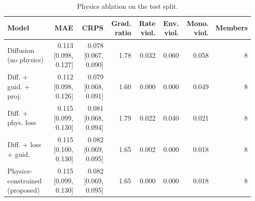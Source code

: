 \begin{table}[t]
\centering
\caption{Physics ablation on the test split.}
\label{tab:ablation}
\scriptsize
\begin{tabular}{lrrrrrrr}
\hline
Model & MAE & CRPS & Grad. ratio & Rate viol. & Env. viol. & Mono. viol. & Members \\
\hline
Diffusion (no physics) & 0.113 [0.098, 0.127] & 0.078 [0.067, 0.090] & 1.78 & 0.032 & 0.060 & 0.058 & 8 \\
Diff. + guid. + proj. & 0.112 [0.098, 0.126] & 0.079 [0.068, 0.091] & 1.60 & 0.000 & 0.000 & 0.049 & 8 \\
Diff. + phys. loss & 0.115 [0.099, 0.130] & 0.081 [0.068, 0.094] & 1.79 & 0.022 & 0.040 & 0.021 & 8 \\
Diff. + loss + guid. & 0.115 [0.100, 0.130] & 0.082 [0.069, 0.095] & 1.65 & 0.002 & 0.000 & 0.018 & 8 \\
Physics-constrained (proposed) & 0.115 [0.099, 0.130] & 0.082 [0.069, 0.095] & 1.65 & 0.000 & 0.000 & 0.018 & 8 \\
\hline
\end{tabular}
\end{table}

